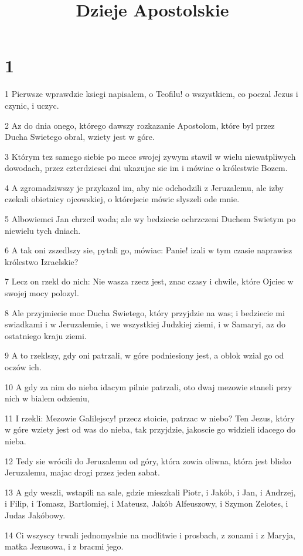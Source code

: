 

\title{Dzieje Apostolskie}


\chapter{1}

\par 1 Pierwsze wprawdzie ksiegi napisalem, o Teofilu! o wszystkiem, co poczal Jezus i czynic, i uczyc.
\par 2 Az do dnia onego, którego dawszy rozkazanie Apostolom, które byl przez Ducha Swietego obral, wziety jest w góre.
\par 3 Którym tez samego siebie po mece swojej zywym stawil w wielu niewatpliwych dowodach, przez czterdziesci dni ukazujac sie im i mówiac o królestwie Bozem.
\par 4 A zgromadziwszy je przykazal im, aby nie odchodzili z Jeruzalemu, ale izby czekali obietnicy ojcowskiej, o którejscie mówic slyszeli ode mnie.
\par 5 Albowiemci Jan chrzcil woda; ale wy bedziecie ochrzczeni Duchem Swietym po niewielu tych dniach.
\par 6 A tak oni zszedlszy sie, pytali go, mówiac: Panie! izali w tym czasie naprawisz królestwo Izraelskie?
\par 7 Lecz on rzekl do nich: Nie wasza rzecz jest, znac czasy i chwile, które Ojciec w swojej mocy polozyl.
\par 8 Ale przyjmiecie moc Ducha Swietego, który przyjdzie na was; i bedziecie mi swiadkami i w Jeruzalemie, i we wszystkiej Judzkiej ziemi, i w Samaryi, az do ostatniego kraju ziemi.
\par 9 A to rzeklszy, gdy oni patrzali, w góre podniesiony jest, a oblok wzial go od oczów ich.
\par 10 A gdy za nim do nieba idacym pilnie patrzali, oto dwaj mezowie staneli przy nich w bialem odzieniu,
\par 11 I rzekli: Mezowie Galilejscy! przecz stoicie, patrzac w niebo? Ten Jezus, który w góre wziety jest od was do nieba, tak przyjdzie, jakoscie go widzieli idacego do nieba.
\par 12 Tedy sie wrócili do Jeruzalemu od góry, która zowia oliwna, która jest blisko Jeruzalemu, majac drogi przez jeden sabat.
\par 13 A gdy weszli, wstapili na sale, gdzie mieszkali Piotr, i Jakób, i Jan, i Andrzej, i Filip, i Tomasz, Bartlomiej, i Mateusz, Jakób Alfeuszowy, i Szymon Zelotes, i Judas Jakóbowy.
\par 14 Ci wszyscy trwali jednomyslnie na modlitwie i prosbach, z zonami i z Maryja, matka Jezusowa, i z bracmi jego.
